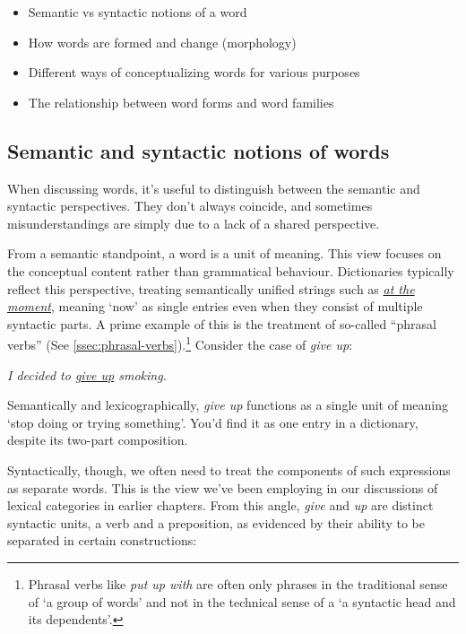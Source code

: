 \begin{itemize}[noitemsep]
   \item Semantic vs syntactic notions of a word
   \item How words are formed and change (morphology)
   \item Different ways of conceptualizing words for various purposes
   \item The relationship between word forms and word families
\end{itemize}

\subsection{Semantic and syntactic notions of words}

When discussing words, it's useful to distinguish between the semantic and syntactic perspectives. They don't always coincide, and sometimes misunderstandings are simply due to a lack of a shared perspective.

From a semantic standpoint, a word is a unit of meaning. This view focuses on the conceptual content rather than grammatical behaviour. Dictionaries typically reflect this perspective, treating semantically unified strings such as \href{https://www.ldoceonline.com/dictionary/at-the-moment}{\textit{at the moment}}, meaning `now' as single entries even when they consist of multiple syntactic parts. A prime example of this is the treatment of so-called ``phrasal verbs'' (See \ref{ssec:phrasal-verbs}).\footnote{Phrasal verbs like \textit{put up with} are often only phrases in the traditional sense of `a group of words' and not in the technical sense of a `a syntactic head and its dependents'.} Consider the case of \textit{give up}:

\ea \textit{I decided to \uline{give up} smoking.}
\z

\noindent Semantically and lexicographically, \textit{give up} functions as a single unit of meaning `stop doing or trying something'. You'd find it as one entry in a dictionary, despite its two-part composition.

Syntactically, though, we often need to treat the components of such expressions as separate words. This is the view we've been employing in our discussions of lexical categories in earlier chapters. From this angle, \textit{give} and \textit{up} are distinct syntactic units, a verb and a preposition, as evidenced by their ability to be separated in certain constructions:

